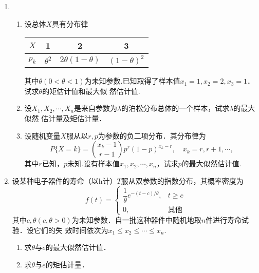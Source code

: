 \documentclass[10pt,a4paper]{article}
\begin{document}
\begin{enumerate}
    \item \begin{enumerate}
        \item 设总体$X$具有分布律
        \renewcommand{\arraystretch}{1.3}
        \begin{table}[H]\centering
            \begin{tabular}{c|ccc}
            $X$   & 1            & 2          & 3                                 \\ \hline
            $p_k$ & $\theta^2$ & $2\theta(1-\theta)$ & $(1-\theta)^2$ 
            \end{tabular}
        \end{table}
        \renewcommand{\arraystretch}{1.0}
        其中$\theta(0<\theta<1)$为未知参数.已知取得了样本值$x_1=1,x_2=2,x_3=1$．试求$\theta$的矩估计值和最大似
        然估计值.
        \item 设$X_1,X_2,\cdots,X_n$是来自参数为$\lambda$的泊松分布总体的一个样本，试求$\lambda$的最大似然
        估计量及矩估计量．
        \item 设随机变量$X$服从以$r,p$为参数的负二项分布．其分布律为
        $$P\{X=k\}=\binom{x_k-1}{r-1}p^r(1-p)^{x_k-r},\quad x_k=r,r+1,\cdots,$$
        其中$r$已知，$p$未知.设有样本值$x_1,x_2,\cdots,x_n$，试求$p$的最大似然估计值. 
    \end{enumerate}




    \item 设某种电子器件的寿命（以h计）$T$服从双参数的指数分布，其概率密度为
    $$f(t)=\left\{\begin{array}{ll}
        \dfrac{1}{\theta} e^{-(t-c)/\theta}, & t\geq c\\
        0, & \mbox{其他}
    \end{array}\right.$$
    其中$c,\theta(c,\theta>0)$为未知参数．自一批这种器件中随机地取$n$件进行寿命试验．设它们的失
    效时间依次为$x_1\leq x_2\leq \cdots \leq x_n$.
    \begin{enumerate}
        \item 求$\theta$与$e$的最大似然估计值．
        \item 求$\theta$与$e$的矩估计量．
    \end{enumerate}





\end{enumerate}
\end{document}
